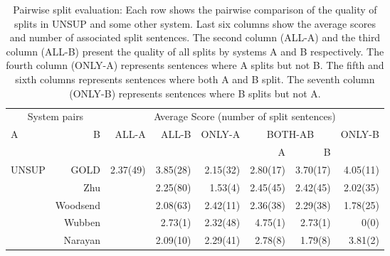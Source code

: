 \documentclass[11pt,a4paper]{article}
\begin{document}
\begin{table*}[htbp]
\begin{center}
\begin{footnotesize}
\begin{tabular}{|lr|r|r|r|r|r|r|}\hline

\multicolumn{2}{|c|}{System pairs} & \multicolumn{6}{|c|}{Average
  Score (number of split sentences)} \\ \cline{3-8}

\multirow{2}{*}{A} & \multirow{2}{*}{B} &
\multirow{2}{*}{ALL-A} & \multirow{2}{*}{ALL-B} &
\multirow{2}{*}{ONLY-A} & \multicolumn{2}{c|}{BOTH-AB} &
\multirow{2}{*}{ONLY-B} \\ \cline{6-7}

& & & & & A & B & \\ \hline

\multirow{5}{*}{UNSUP} & GOLD & \multirow{5}{*}{2.37(49)} & 3.85(28) &
2.15(32) & 2.80(17) & 3.70(17) & 4.05(11) \\

& Zhu & & 2.25(80) & 1.53(4) & 2.45(45) & 2.42(45) & 2.02(35)\\
& Woodsend & & 2.08(63) & 2.42(11) & 2.36(38) & 2.29(38) & 1.78(25) \\
& Wubben & & 2.73(1) & 2.32(48) & 4.75(1) & 2.73(1) & 0(0) \\
& Narayan & & 2.09(10) & 2.29(41) & 2.78(8) & 1.79(8) & 3.81(2) \\\hline
\end{tabular}
\caption{\small Pairwise split evaluation: Each row shows the pairwise
  comparison of the quality of splits in UNSUP and some other
  system. Last six columns show the average scores and number of
  associated split sentences. The second column (ALL-A) and the third
  column (ALL-B) present the quality of all splits by systems A and B
  respectively. The fourth column (ONLY-A) represents sentences where
  A splits but not B. The fifth and sixth columns represents sentences
  where both A and B split. The seventh column (ONLY-B) represents
  sentences where B splits but not
  A.}\label{pairwise-split-evaluation}
\vspace{-0.5cm}
\end{footnotesize}
\end{center}
\end{table*}
\end{document}
